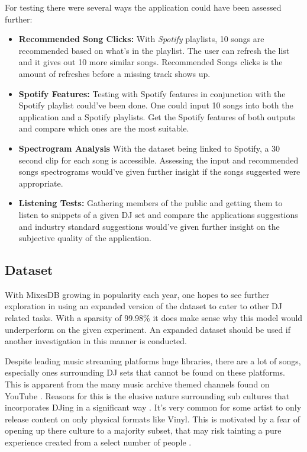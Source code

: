 For testing there were several ways the application could have been assessed further:
\begin{itemize}
	
\item \textbf{Recommended Song Clicks:} With \textit{Spotify} playlists, 10 songs are recommended based on what's in the playlist. The user can refresh the list and it gives out 10 more similar songs. Recommended Songs clicks is the amount of refreshes before a missing track shows up.

\item \textbf{Spotify Features:} Testing with Spotify features in conjunction with the Spotify playlist could've been done. One could input 10 songs into both the  application and a Spotify playlists. Get the Spotify features of both outputs and compare which ones are the most suitable.

\item \textbf{Spectrogram Analysis} With the dataset being linked to Spotify, a 30 second clip for each song is accessible. Assessing the input and recommended songs spectrograms would've given further insight if the songs suggested were appropriate.

\item \textbf{Listening Tests:} Gathering members of the public and getting them to listen to snippets of a given DJ set and compare the applications suggestions and industry standard suggestions would've given further insight on the subjective quality of the application.
\end{itemize}

\subsection{Dataset}
With MixesDB growing in popularity each year, one hopes to see further exploration in using an expanded version of the dataset to cater to other DJ related tasks. With a sparsity of 99.98\% it does make sense why this model would underperform on the given experiment. An expanded dataset should be used if another investigation in this manner is conducted. 

Despite leading music streaming platforms huge libraries, there are a lot of songs, especially ones surrounding DJ sets that cannot be found on these platforms. This is apparent from the many music archive themed channels found on YouTube \citep{allen_djs_2021}.  Reasons for this is the elusive nature surrounding sub cultures that incorporates DJing in a significant way \citep{reynolds_energy_2013}. It's very common for some artist to only release content on only physical formats like Vinyl. This is motivated by a fear of opening up there culture to a majority subset, that may risk tainting a pure experience created from a select number of people \citep{wheeler_gentrification_2020}. 

